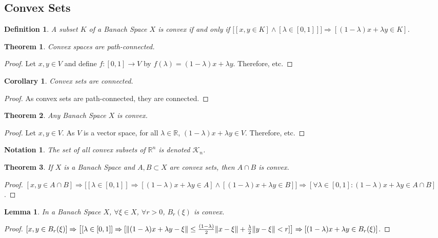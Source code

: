 \documentclass[crop=false,class=book]{standalone}
\theoremstyle{mystyle}
\newtheorem{theorem}{Theorem}[section]
\newtheorem{definition}{Definition}[section]
\newtheorem{lemma}{Lemma}[section]
\newtheorem{corollary}{Corollary}[section]
\newtheorem{notation}{Notation}[section]
\DeclarePairedDelimiter\norm{\lVert}{\rVert}
\begin{document}
\subsection{Convex Sets}
\begin{definition}
A subset $K$ of a Banach Space $X$ is convex if and only if $\big[[x,y\in K]\land  [\lambda \in [0,1]]\big]\Rightarrow[(1-\lambda)x+\lambda y\in K]$.
\end{definition}
\begin{theorem}
Convex spaces are path-connected.
\end{theorem}
\begin{proof}
Let $x,y\in V$ and define $f:[0,1]\rightarrow V$ by $f(\lambda) = (1-\lambda)x+\lambda y$. Therefore, etc.
\end{proof}
\begin{corollary}
Convex sets are connected.
\end{corollary}
\begin{proof}
As convex sets are path-connected, they are connected.
\end{proof}
\begin{theorem}
Any Banach Space $X$ is convex.
\end{theorem}
\begin{proof}
Let $x,y\in V$. As $V$ is a vector space, for all $\lambda \in \mathbb{R}$, $(1-\lambda)x+\lambda y\in V$. Therefore, etc.
\end{proof}
\begin{notation}
The set of all convex subsets of $\mathbb{R}^n$ is denoted $\mathscr{K}_n$.
\end{notation}
\begin{theorem}
If $X$ is a Banach Space and $A,B\subset X$ are convex sets, then $A\cap B$ is convex.
\end{theorem}
\begin{proof}
$[x,y \in A\cap B] \Rightarrow \big[[\lambda \in [0,1]]\Rightarrow[ (1-\lambda)x+\lambda y \in A]\land [ (1-\lambda)x+\lambda y \in B]\big] \Rightarrow [\forall \lambda \in [0,1]:(1-\lambda)x+\lambda y \in A\cap B]$. 
\end{proof}
\begin{lemma}
In a Banach Space $X$, $\forall \xi \in X$, $\forall r>0$, $B_{r}(\xi)$ is convex.
\end{lemma}
\begin{proof}
$[x,y\in B_{r}(\xi)]\Rightarrow\big[[\lambda \in [0,1]]\Rightarrow [\norm{(1-\lambda)x+\lambda y-\xi}\leq \frac{(1-\lambda)}{2}\norm{x-\xi}+\frac{\lambda}{2} \norm{y-\xi}< r]\big]\Rightarrow [(1-\lambda)x+\lambda y \in B_{r}(\xi)]$.
\end{proof}
\end{document}
